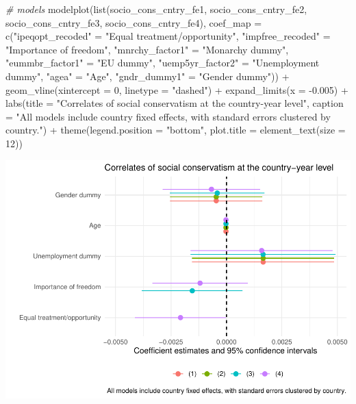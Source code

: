 \documentclass[
]{article}
\newenvironment{Shaded}{\begin{snugshade}}{\end{snugshade}}
\newcommand{\AttributeTok}[1]{\textcolor[rgb]{0.77,0.63,0.00}{#1}}
\newcommand{\CommentTok}[1]{\textcolor[rgb]{0.56,0.35,0.01}{\textit{#1}}}
\newcommand{\DecValTok}[1]{\textcolor[rgb]{0.00,0.00,0.81}{#1}}
\newcommand{\FloatTok}[1]{\textcolor[rgb]{0.00,0.00,0.81}{#1}}
\newcommand{\FunctionTok}[1]{\textcolor[rgb]{0.00,0.00,0.00}{#1}}
\newcommand{\NormalTok}[1]{#1}
\newcommand{\OtherTok}[1]{\textcolor[rgb]{0.56,0.35,0.01}{#1}}
\newcommand{\SpecialCharTok}[1]{\textcolor[rgb]{0.00,0.00,0.00}{#1}}
\newcommand{\StringTok}[1]{\textcolor[rgb]{0.31,0.60,0.02}{#1}}
\begin{document}
\begin{Shaded}
\begin{Highlighting}[]
\CommentTok{\# models }
\FunctionTok{modelplot}\NormalTok{(}\FunctionTok{list}\NormalTok{(socio\_cons\_cntry\_fe1, socio\_cons\_cntry\_fe2, }
\NormalTok{               socio\_cons\_cntry\_fe3, socio\_cons\_cntry\_fe4),}
          \AttributeTok{coef\_map =} \FunctionTok{c}\NormalTok{(}\StringTok{"ipeqopt\_recoded"} \OtherTok{=} \StringTok{"Equal treatment/opportunity"}\NormalTok{, }
                       \StringTok{"impfree\_recoded"} \OtherTok{=} \StringTok{"Importance of freedom"}\NormalTok{, }
                       \StringTok{"mnrchy\_factor1"} \OtherTok{=} \StringTok{"Monarchy dummy"}\NormalTok{, }
                       \StringTok{"eummbr\_factor1"} \OtherTok{=} \StringTok{"EU dummy"}\NormalTok{, }
                       \StringTok{"uemp5yr\_factor2"} \OtherTok{=} \StringTok{"Unemployment dummy"}\NormalTok{, }
                       \StringTok{"agea"} \OtherTok{=} \StringTok{"Age"}\NormalTok{, }
                       \StringTok{"gndr\_dummy1"} \OtherTok{=} \StringTok{"Gender dummy"}\NormalTok{)) }\SpecialCharTok{+}
  \FunctionTok{geom\_vline}\NormalTok{(}\AttributeTok{xintercept =} \DecValTok{0}\NormalTok{, }\AttributeTok{linetype =} \StringTok{"dashed"}\NormalTok{) }\SpecialCharTok{+}
  \FunctionTok{expand\_limits}\NormalTok{(}\AttributeTok{x =} \SpecialCharTok{{-}}\FloatTok{0.005}\NormalTok{) }\SpecialCharTok{+}
  \FunctionTok{labs}\NormalTok{(}\AttributeTok{title =} \StringTok{"Correlates of social conservatism at the country{-}year level"}\NormalTok{, }
       \AttributeTok{caption =} \StringTok{"All models include country fixed effects, with standard errors clustered by country."}\NormalTok{) }\SpecialCharTok{+}
  \FunctionTok{theme}\NormalTok{(}\AttributeTok{legend.position =} \StringTok{"bottom"}\NormalTok{, }
        \AttributeTok{plot.title =} \FunctionTok{element\_text}\NormalTok{(}\AttributeTok{size =} \DecValTok{12}\NormalTok{))}
\end{Highlighting}
\end{Shaded}

\includegraphics{AVCD-Assignment3-Edenhofer_files/figure-latex/socio-cons-cntry-fe-1.pdf}
\end{document}
